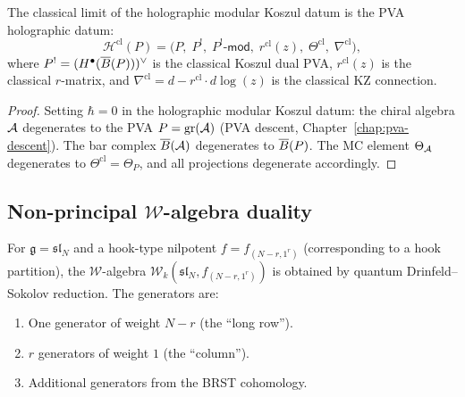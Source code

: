 \begin{proposition}
The classical limit of the holographic modular Koszul datum is
the PVA holographic datum:
\begin{equation}%
\mathcal{H}^{\mathrm{cl}}(P)
= \bigl(
P,\; P^!,\; P^!\text{-}\mathsf{mod},\;
r^{\mathrm{cl}}(z),\; \Theta^{\mathrm{cl}},\;
\nabla^{\mathrm{cl}}
\bigr),
\end{equation}
where $P^! = (H^\bullet(\overline{B}(P)))^\vee$ is the classical Koszul
dual PVA, $r^{\mathrm{cl}}(z)$ is the classical $r$-matrix, and
$\nabla^{\mathrm{cl}} = d - r^{\mathrm{cl}} \cdot d\log(z)$ is
the classical KZ connection.
\end{proposition}

\begin{proof}
Setting $\hbar = 0$ in the holographic modular Koszul datum:
the chiral algebra $\mathcal{A}$ degenerates to the PVA $P = \operatorname{gr}(\mathcal{A})$
(PVA descent, Chapter~\ref{chap:pva-descent}). The bar complex
$\overline{B}(\mathcal{A})$ degenerates to $\overline{B}(P)$. The MC element
$\Theta_{\mathcal{A}}$ degenerates to $\Theta^{\mathrm{cl}} = \Theta_P$,
and all projections degenerate accordingly.
\end{proof}


\subsection{Non-principal $\mathcal{W}$-algebra duality}

\begin{definition}
For $\mathfrak{g} = \mathfrak{sl}_N$ and a hook-type nilpotent
$f = f_{(N-r, 1^r)}$ (corresponding to a hook partition), the
$\mathcal{W}$-algebra $\mathcal{W}_k(\mathfrak{sl}_N, f_{(N-r, 1^r)})$
is obtained by quantum Drinfeld--Sokolov reduction. The generators
are:
\begin{enumerate}[label=\textup{(\roman*)}]
\item One generator of weight $N - r$ (the ``long row'').
\item $r$ generators of weight $1$ (the ``column'').
\item Additional generators from the BRST cohomology.
\end{enumerate}
\end{definition}

